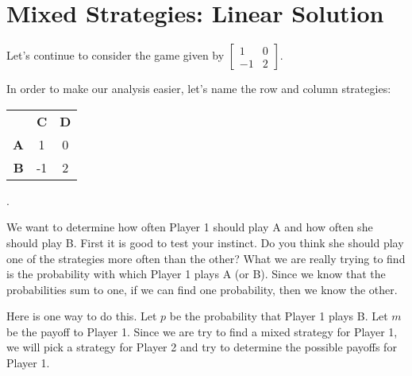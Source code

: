 
\section{Mixed Strategies: Linear Solution}

Let's continue to consider the game given by $\left[\begin{matrix}
1&0\\
-1&2

\end{matrix}\right].$

In order to make our analysis easier, let's name the row and column strategies:

\begin{tabular}{rcc}
&\textbf{C}&\textbf{D}\\ 
\textbf{A} &1&0 \\ 
\textbf{B}&-1&2 \\ 
\end{tabular}.

We want to determine how often Player 1 should play A and how often she should play B. First it is good to test your instinct. Do you think she should play one of the strategies more often than the other? 
What we are really trying to find is the probability with which Player 1 plays A (or B). Since we know that the probabilities sum to one, if we can find one probability, then we know the other. 

Here is one way to do this. Let $p$ be the probability that Player 1 plays B. Let $m$ be the payoff to Player 1. Since we are try to find a mixed strategy for Player 1, we will pick a strategy for Player 2 and try to determine the possible payoffs for Player 1.

